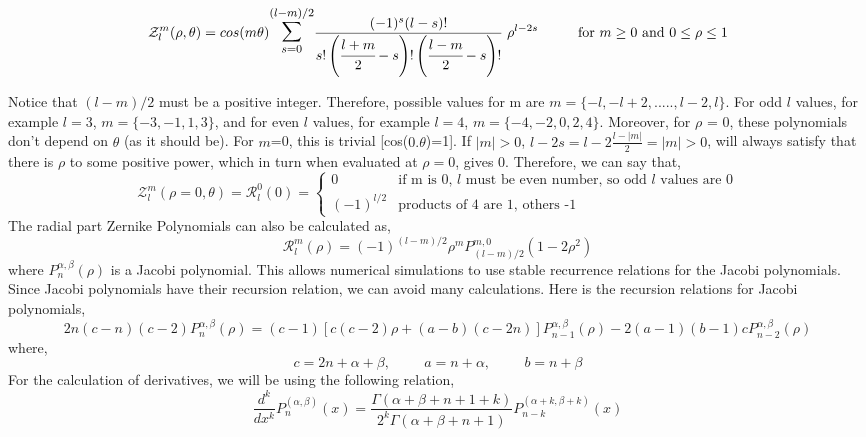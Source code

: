 \begin{equation}
    \mathcal{Z}_l^m(\rho,\theta) = cos(m\theta) \mathlarger{\mathlarger{\sum}}_{s=0}^{(l-m)/2} \frac{(-1)^s(l-s)!}{ s!\left( \cfrac{l+m}{2} - s\right)! \left( \cfrac{l-m}{2} - s\right)!  }\hspace{0.1cm} \rho^{l-2s} \hspace{1cm}\text{for } m\geq0  \text{ and } 0\leq\rho\leq 1
\end{equation}

Notice that $(l-m)/2$ must be a positive integer. Therefore, possible values for m are $m= \{-l, -l+2, ..... , l-2, l\}$. For odd $l$ values, for example $l=3$, $m=\{-3, -1, 1, 3\}$, and for even $l$ values, for example $l=4$, $m = \{-4, -2, 0, 2, 4\}$. Moreover, for $\rho$ = 0, these polynomials don't depend on $\theta$ (as it should be). For $m$=0, this is trivial [cos($0.\theta$)=1]. If $|m|>0$, $l-2s = l-2\frac{l-|m|}{2} = |m| > 0$, will always satisfy that there is $\rho$ to some positive power, which in turn when evaluated at $\rho = 0$, gives 0. Therefore, we can say that,
\begin{equation}
    \mathcal{Z}_l^m(\rho=0,\theta) = \mathcal{R}_l^0(0) = \begin{cases}
        0 & \text{if m is 0, $l$ must be even number, so odd $l$ values are 0}\\
        (-1)^{l/2}  & \text{products of 4 are 1, others -1}
    \end{cases} \label{zernike-at0}
\end{equation}
The radial part Zernike Polynomials can also be calculated as,
\begin{equation}
    \mathcal{R}_l^m(\rho) = (-1)^{(l-m)/2} \rho^m  P_{(l-m)/2}^{m, 0} (1 - 2 \rho^2)
\end{equation}
where $P_{n}^{\alpha, \beta}(\rho)$ is a Jacobi polynomial. This allows numerical simulations to use stable recurrence relations for the Jacobi polynomials. Since Jacobi polynomials have their recursion relation, we can avoid many calculations. Here is the recursion relations for Jacobi polynomials,
\begin{equation}
    2n(c-n)(c-2)P_{n}^{\alpha,\beta}(\rho) = (c-1)[c(c-2)\rho + (a-b)(c-2n)]P_{n-1}^{\alpha,\beta}(\rho) - 2(a-1)(b-1)cP_{n-2}^{\alpha,\beta}(\rho)
\end{equation}
where,
\begin{equation}
    c = 2n + \alpha + \beta, \hspace{1cm} a = n +\alpha, \hspace{1cm} b = n + \beta
\end{equation}
For the calculation of derivatives, we will be using the following relation,
\begin{equation}
    \frac{d^k}{dx^k} P_n^{(\alpha, \beta)}(x) = \frac{\Gamma(\alpha + \beta + n + 1 + k)}{2^k\Gamma(\alpha + \beta + n + 1)} P_{n-k}^{(\alpha + k, \beta + k)}(x)
\end{equation}

